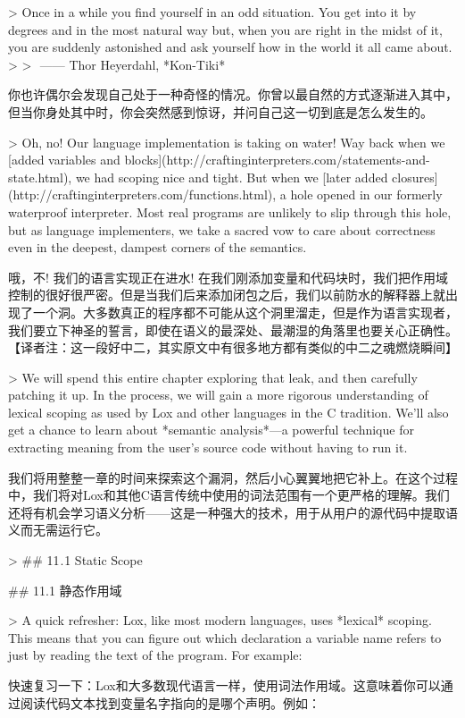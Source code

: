\documentclass[cn,11pt,chinese]{elegantbook}
\begin{document}
{{{{{{{{{{{{> Once in a while you find yourself in an odd situation. You get into it by degrees and in the most natural way but, when you are right in the midst of it, you are suddenly astonished and ask yourself how in the world it all came about.
>
> ​																																				——  Thor Heyerdahl, *Kon-Tiki*

你也许偶尔会发现自己处于一种奇怪的情况。你曾以最自然的方式逐渐进入其中，但当你身处其中时，你会突然感到惊讶，并问自己这一切到底是怎么发生的。

> Oh, no! Our language implementation is taking on water! Way back when we [added variables and blocks](http://craftinginterpreters.com/statements-and-state.html), we had scoping nice and tight. But when we [later added closures](http://craftinginterpreters.com/functions.html), a hole opened in our formerly waterproof interpreter. Most real programs are unlikely to slip through this hole, but as language implementers, we take a sacred vow to care about correctness even in the deepest, dampest corners of the semantics.

哦，不! 我们的语言实现正在进水! 在我们刚添加变量和代码块时，我们把作用域控制的很好很严密。但是当我们后来添加闭包之后，我们以前防水的解释器上就出现了一个洞。大多数真正的程序都不可能从这个洞里溜走，但是作为语言实现者，我们要立下神圣的誓言，即使在语义的最深处、最潮湿的角落里也要关心正确性。【译者注：这一段好中二，其实原文中有很多地方都有类似的中二之魂燃烧瞬间】

> We will spend this entire chapter exploring that leak, and then carefully patching it up. In the process, we will gain a more rigorous understanding of lexical scoping as used by Lox and other languages in the C tradition. We’ll also get a chance to learn about *semantic analysis*—a powerful technique for extracting meaning from the user’s source code without having to run it.

我们将用整整一章的时间来探索这个漏洞，然后小心翼翼地把它补上。在这个过程中，我们将对Lox和其他C语言传统中使用的词法范围有一个更严格的理解。我们还将有机会学习语义分析——这是一种强大的技术，用于从用户的源代码中提取语义而无需运行它。

> ## 11 . 1 Static Scope

## 11.1 静态作用域

> A quick refresher: Lox, like most modern languages, uses *lexical* scoping. This means that you can figure out which declaration a variable name refers to just by reading the text of the program. For example:

快速复习一下：Lox和大多数现代语言一样，使用词法作用域。这意味着你可以通过阅读代码文本找到变量名字指向的是哪个声明。例如：

}}}}}}}}}}}}
\end{document}
